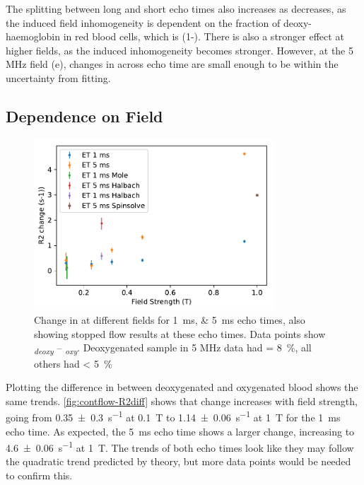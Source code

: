 The splitting between long and short echo times also increases as \SOtwo decreases, as the induced field inhomogeneity is dependent on the fraction of deoxy-haemoglobin in red blood cells, which is (1-\SOtwo).
There is also a stronger effect at higher fields, as the induced inhomogeneity becomes stronger.
However, at the 5 MHz field (e), changes in \Rtwo across echo time are small enough to be within the uncertainty from fitting.

\subsection{Dependence on Field}
\label{sec:contflow-fielddep}
\begin{figure}[ht]
\centering
\includegraphics[width=0.8\textwidth]{figures/contflow/R2fieldDep.pdf}
\caption[Change in \Rtwo at different fields]{Change in \Rtwo at different fields for \SIlist{1;5}{ms} echo times, also showing stopped flow results at these echo times. Data points show \Rtwo\textsubscript{\textit{deoxy}} -- \Rtwo\textsubscript{\textit{oxy}}. Deoxygenated sample in 5 MHz data had \SOtwo = \SI{8}{\percent}, all others had \SOtwo < \SI{5}{\percent}}
\label{fig:contflow-R2diff}
\end{figure}

Plotting the difference in \Rtwo between deoxygenated and oxygenated blood shows the same trends.
\autoref{fig:contflow-R2diff} shows that \Rtwo change increases with field strength, going from \SI{0.35\pm0.3}{s^{-1}} at \SI{0.1}{T} to \SI{1.14\pm0.06}{s^{-1}} at \SI{1}{T} for the \SI{1}{ms} echo time.
As expected, the \SI{5}{ms} echo time shows a larger \Rtwo change, increasing to \SI{4.6\pm0.06}{s^{-1}} at \SI{1}{T}.
The trends of both echo times look like they may follow the quadratic trend predicted by theory, but more data points would be needed to confirm this.

